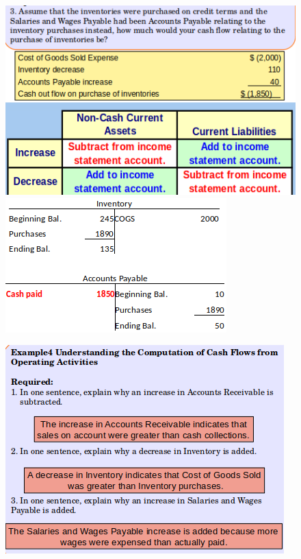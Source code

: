 \documentclass[../main.tex]{subfiles}
\begin{document}
\begin{figure}[ht!]
		\includegraphics[width=0.95\columnwidth]{images/c11/cash_flows_eg3_p5.png}
		\includegraphics[width=0.75\columnwidth]{images/c11/cash_flows_eg3_p6.png}
	\end{figure}
	
	\begin{figure}[ht!]
		\centering
		\includegraphics[width=0.9\columnwidth]{images/c11/cash_flows_eg4.png}
	\end{figure}
\end{document}
